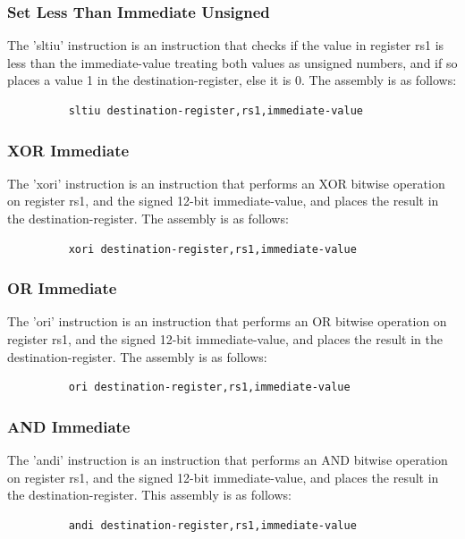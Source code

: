 \documentclass{article}
\begin{document}
\subsubsection{Set Less Than Immediate Unsigned}
\qquad
The 'sltiu' instruction is an instruction that checks if the value in register rs1 is less than the immediate-value treating both values as unsigned numbers, and if so places a value 1 in the destination-register, else it is 0. The assembly is as follows:
\begin{figure}[!htbp]
    \centering
    \begin{verbatim}
    sltiu destination-register,rs1,immediate-value
    \end{verbatim}
\end{figure}\newline

\subsubsection{XOR Immediate}
\qquad
The 'xori' instruction is an instruction that performs an XOR bitwise operation on register rs1, and the signed 12-bit immediate-value, and places the result in the destination-register. The assembly is as follows:
\begin{figure}[!htbp]
    \centering
    \begin{verbatim}
    xori destination-register,rs1,immediate-value
    \end{verbatim}
\end{figure}\newline

\subsubsection{OR Immediate}
\qquad
The 'ori' instruction is an instruction that performs an OR bitwise operation on register rs1, and the signed 12-bit immediate-value, and places the result in the destination-register. The assembly is as follows:
\begin{figure}[!htbp]
    \centering
    \begin{verbatim}
    ori destination-register,rs1,immediate-value
    \end{verbatim}
\end{figure}\newline

\subsubsection{AND Immediate}
\qquad
The 'andi' instruction is an instruction that performs an AND bitwise operation on register rs1, and the signed 12-bit immediate-value, and places the result in the destination-register. This assembly is as follows:
\begin{figure}[!htbp]
    \centering
    \begin{verbatim}
    andi destination-register,rs1,immediate-value
    \end{verbatim}
\end{figure}\newline
\end{document}
